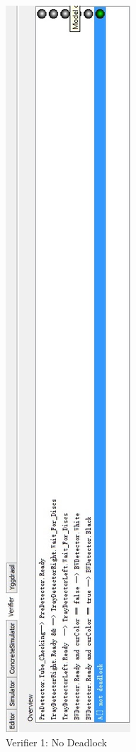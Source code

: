 \documentclass[a4paper,oneside,11pt]{report}
\begin{document}
\begin{figure}
\centering
\includegraphics[height=0.75\textheight]{images/verify1.jpg}
\caption{Verifier 1: No Deadlock}
\label{fig:verify1}
\end{figure}
\end{document}
